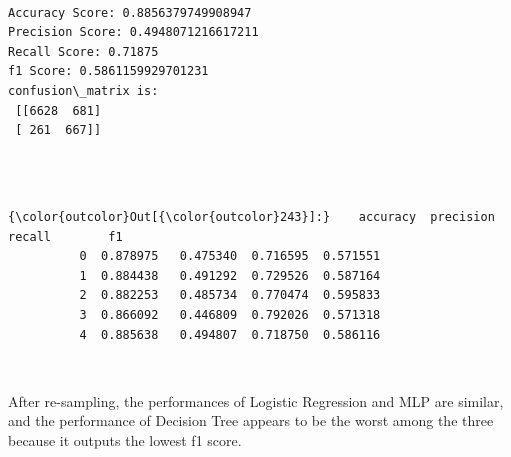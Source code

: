 \documentclass[11pt]{article}
\begin{document}
   

    \begin{center}
    \end{center}
    { \hspace*{\fill} \\}
    
    \begin{Verbatim}[commandchars=\\\{\}]
Accuracy Score: 0.8856379749908947
Precision Score: 0.4948071216617211
Recall Score: 0.71875
f1 Score: 0.5861159929701231
confusion\_matrix is: 
 [[6628  681]
 [ 261  667]] 


    \end{Verbatim}

 

    \begin{center}
    \end{center}
    { \hspace*{\fill} \\}
    
\begin{Verbatim}[commandchars=\\\{\}]
{\color{outcolor}Out[{\color{outcolor}243}]:}    accuracy  precision    recall        f1
          0  0.878975   0.475340  0.716595  0.571551
          1  0.884438   0.491292  0.729526  0.587164
          2  0.882253   0.485734  0.770474  0.595833
          3  0.866092   0.446809  0.792026  0.571318
          4  0.885638   0.494807  0.718750  0.586116
\end{Verbatim}
            
    \begin{center}
    \end{center}
    { \hspace*{\fill} \\}
    
    After re-sampling, the performances of Logistic Regression and MLP are
similar, and the performance of Decision Tree appears to be the worst
among the three because it outputs the lowest f1 score.


    
    
    
    
\end{document}
